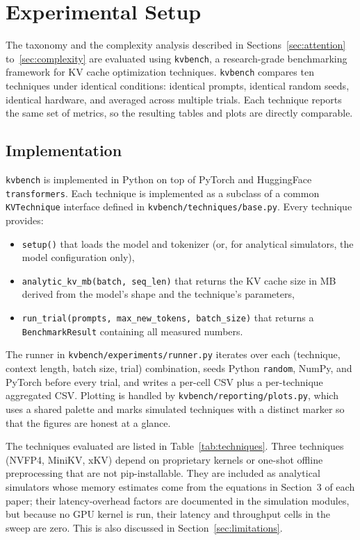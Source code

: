 \documentclass[conference]{IEEEtran}
\begin{document}
\section{Experimental Setup}
\label{sec:setup}

The taxonomy and the complexity analysis described in Sections~\ref{sec:attention} to~\ref{sec:complexity} are evaluated using \texttt{kvbench}, a research-grade benchmarking framework for KV cache optimization techniques. \texttt{kvbench} compares ten techniques under identical conditions: identical prompts, identical random seeds, identical hardware, and averaged across multiple trials. Each technique reports the same set of metrics, so the resulting tables and plots are directly comparable.

\subsection{Implementation}
\label{sec:implementation}

\texttt{kvbench} is implemented in Python on top of PyTorch and HuggingFace \texttt{transformers}. Each technique is implemented as a subclass of a common \texttt{KVTechnique} interface defined in \texttt{kvbench/techniques/base.py}. Every technique provides:

\begin{itemize}
	\item \texttt{setup()} that loads the model and tokenizer (or, for analytical simulators, the model configuration only),
	\item \texttt{analytic\_kv\_mb(batch, seq\_len)} that returns the KV cache size in MB derived from the model's shape and the technique's parameters,
	\item \texttt{run\_trial(prompts, max\_new\_tokens, batch\_size)} that returns a \texttt{BenchmarkResult} containing all measured numbers.
\end{itemize}

\noindent The runner in \texttt{kvbench/experiments/runner.py} iterates over each (technique, context length, batch size, trial) combination, seeds Python \texttt{random}, NumPy, and PyTorch before every trial, and writes a per-cell CSV plus a per-technique aggregated CSV. Plotting is handled by \texttt{kvbench/reporting/plots.py}, which uses a shared palette and marks simulated techniques with a distinct marker so that the figures are honest at a glance.

\noindent The techniques evaluated are listed in Table~\ref{tab:techniques}. Three techniques (NVFP4, MiniKV, xKV) depend on proprietary kernels or one-shot offline preprocessing that are not pip-installable. They are included as analytical simulators whose memory estimates come from the equations in Section~3 of each paper; their latency-overhead factors are documented in the simulation modules, but because no GPU kernel is run, their latency and throughput cells in the sweep are zero. This is also discussed in Section~\ref{sec:limitations}.
\end{document}

